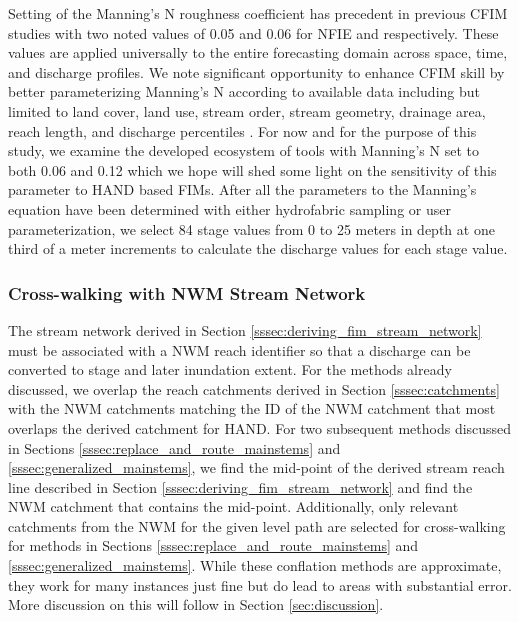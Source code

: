 Setting of the Manning's N roughness coefficient has precedent in previous CFIM studies \cite{maidment2017conceptual,liu2016cybergis,liu2020height,djokic2019arc,garousi2019terrain,zheng2018geoflood} with two noted values of 0.05 and 0.06 for NFIE and  respectively. 
These values are applied universally to the entire forecasting domain across space, time, and discharge profiles.
We note significant opportunity to enhance CFIM skill by better parameterizing Manning's N according to available data including but limited to land cover, land use, stream order, stream geometry, drainage area, reach length, and discharge percentiles \cite{garousi2019terrain,johnson2019integrated}.
For now and for the purpose of this study, we examine the developed ecosystem of tools with Manning's N set to both 0.06 and 0.12 which we hope will shed some light on the sensitivity of this parameter to HAND based FIMs.
After all the parameters to the Manning's equation have been determined with either hydrofabric sampling or user parameterization, we select 84 stage values from 0 to 25 meters in depth at one third of a meter increments to calculate the discharge values for each stage value. 
%
\subsubsection{Cross-walking with NWM Stream Network}
\label{sssec:cross_walking_networks}
%
The stream network derived in Section \ref{sssec:deriving_fim_stream_network} must be associated with a NWM reach identifier so that a discharge can be converted to stage and later inundation extent.
For the methods already discussed, we overlap the reach catchments derived in Section \ref{sssec:catchments} with the NWM catchments matching the ID of the NWM catchment that most overlaps the derived catchment for HAND.
For two subsequent methods discussed in Sections \ref{sssec:replace_and_route_mainstems} and \ref{sssec:generalized_mainstems}, we find the mid-point of the derived stream reach line described in Section \ref{sssec:deriving_fim_stream_network} and find the NWM catchment that contains the mid-point.
Additionally, only relevant catchments from the NWM for the given level path are selected for cross-walking for methods in Sections \ref{sssec:replace_and_route_mainstems} and \ref{sssec:generalized_mainstems}.
While these conflation methods are approximate, they work for many instances just fine but do lead to areas with substantial error. 
More discussion on this will follow in Section \ref{sec:discussion}.
%

